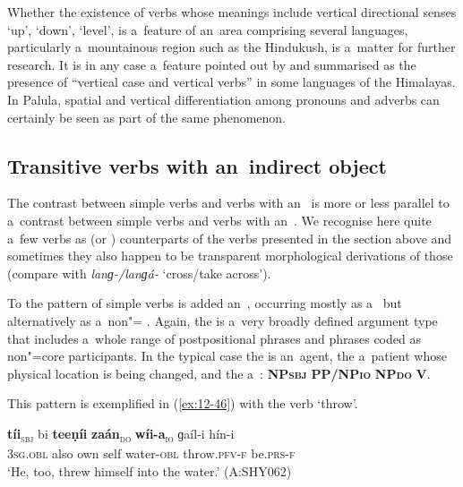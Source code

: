 Whether the existence of verbs whose meanings include vertical directional senses `up', `down', `level', is a~feature of an~area comprising several languages, particularly a~mountainous region such as the Hindukush, is a~matter for further research. It is in any case a~feature pointed out by \citet[9]{noonan2003} and summarised as the presence of ``vertical case and vertical verbs'' in some languages of the Himalayas. In Palula, spatial and vertical differentiation among pronouns and adverbs can certainly be seen as part of the same phenomenon. 


\subsection{Transitive verbs with an~indirect object}
\label{subsec:12-2-5}


The contrast between simple  verbs and  verbs with an~ is more or less parallel to a~contrast between simple  verbs and  verbs with an~. We recognise here quite a~few verbs as  (or ) counterparts of the verbs presented in the section above and sometimes they also happen to be transparent morphological derivations of those (compare with \textit{lanɡ-/lanɡá-} `cross/take across'). 


To the pattern of simple  verbs is added an~, occurring mostly as a~ but alternatively as a~non"=  . Again, the  is a~very broadly defined argument type that includes a~whole range of postpositional phrases and  phrases coded as non"=core participants. In the typical case the  is an~agent, the  a~patient whose physical location is being changed, and the  a~: \textbf{NP\textsc{sbj}} \textbf{PP/NP\textsc{io}} \textbf{NP\textsc{do}} \textbf{V}. 


This pattern is exemplified in (\ref{ex:12-46}) with the verb `throw'.

\begin{exe}
\ex
\label{ex:12-46}
\gll {\ob}\textbf{tíi}{\cb}\textsubscript{\textsc{\upshape sbj}} bi {\ob}\textbf{teeṇíi} \textbf{zaán}{\cb}\textsubscript{\textsc{\upshape do}} {\ob}\textbf{wíi-a}{\cb}\textsubscript{\textsc{\upshape io}} ɡaíl-i hín-i\\
\textsc{3sg.obl} also own self water-\textsc{obl} throw.\textsc{pfv-f} be.\textsc{prs-f}\\
\glt `He, too, threw himself into the water.' (A:SHY062)
\end{exe}

